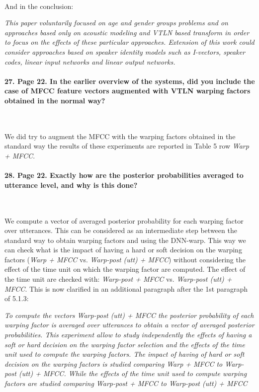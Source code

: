\documentclass[]{article}
\begin{document}
~

And in the conclusion:

\textit{This paper voluntarily focused on age and gender groups problems and on approaches based only on acoustic modeling and VTLN based transform in order to focus on the effects of these particular approaches. Extension of this work could consider approaches based on speaker identity models such as I-vectors, speaker codes, linear input networks and linear output networks.} %
\paragraph{27. Page 22. In the earlier overview of the systems, did you include the case of MFCC feature vectors augmented with VTLN warping factors obtained in the normal way?}

~

We did try to augment the MFCC with the warping factors obtained in the standard way the results of these experiments are reported in Table 5 row {\em Warp + MFCC}.

\paragraph{28. Page 22. Exactly how are the posterior probabilities averaged to utterance level, and why is this done?}

~

We compute a vector of averaged posterior probability for each warping factor over utterances. This can be considered as an intermediate step between the standard way to obtain warping factors and using the DNN-warp. This way we can check what is the impact of having a hard or soft decision on the warping factors ({\em Warp + MFCC} vs. {\em Warp-post (utt) + MFCC}) without considering the effect of the time unit on which the warping factor are computed. The effect of the time unit are checked with: {\em Warp-post + MFCC} vs. {\em Warp-post (utt) + MFCC}. This is now clarified in an additional paragraph after the 1st paragraph of 5.1.3:

\textit{To compute the vectors {\em Warp-post (utt) + MFCC} the posterior probability of each warping factor is averaged over utterances to obtain a vector of averaged posterior probabilities. This experiment allow to study independently the effects of having a soft or hard decision on the warping factor selection and the effects of the time unit used to compute the warping factors. The impact of having of hard or soft decision on the warping factors is studied comparing {\em Warp + MFCC} to {\em Warp-post (utt) + MFCC}. While the effects of the time unit used to compute warping factors are studied comparing {\em Warp-post + MFCC} to {\em Warp-post (utt) + MFCC}}
\end{document}
